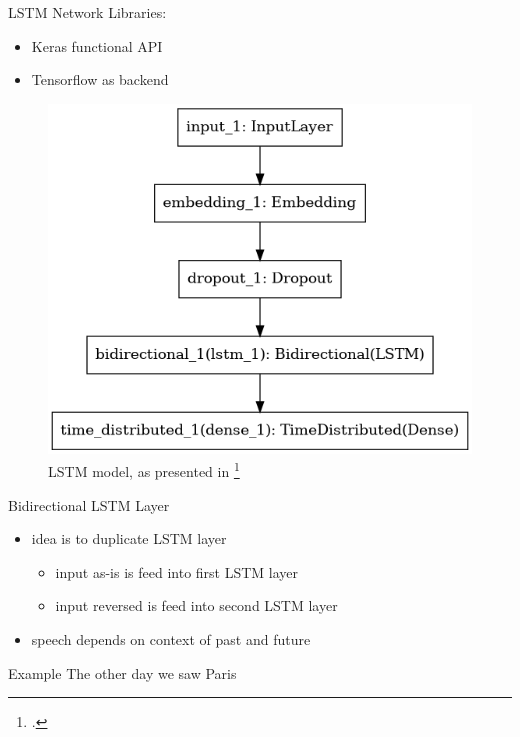 \documentclass[12pt, tikz]{beamer}
\begin{document}
\begin{frame}[fragile]{LSTM Network}
	Libraries:
	\begin{itemize}
		\item Keras functional API
		\item Tensorflow as backend
	\end{itemize}
	\pause
	\vspace{-0.3cm}
	\begin{figure}
		\includegraphics[width=0.6\textheight]{img/lstm_model.png}
		\caption{LSTM model, as presented in \footcite{huang2015bidirectional}}
	\end{figure}
\end{frame}

\begin{frame}[fragile]{Bidirectional LSTM Layer}
	\begin{itemize}
		\item<1-> idea is to duplicate LSTM layer
		\begin{itemize}
			\item<2-> input as-is is feed into first LSTM layer
			\item<3-> input reversed is feed into second LSTM layer
		\end{itemize}
		\item<4-> speech depends on context of past and future
	\end{itemize}

	\begin{exampleblock}{Example}
		The other day we saw Paris  \uncover<6->{\hspace{-0.25cm}\textcolor{red}{Hilton.}}
	\end{exampleblock} 
\end{frame}
\end{document}
